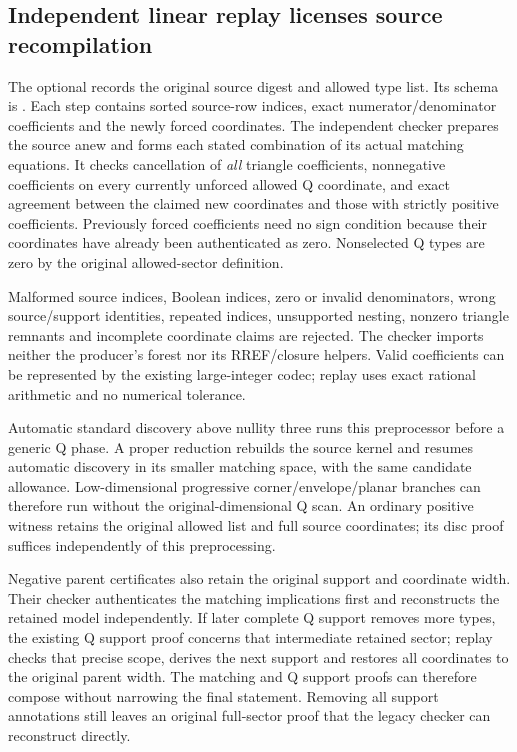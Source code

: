 \subsection{Independent linear replay licenses source recompilation}

The optional  records the original
source digest and allowed type list. Its schema is
. Each step contains sorted source-row indices, exact
numerator/denominator coefficients and the newly forced coordinates.
The independent checker prepares the source anew and forms each stated
combination of its actual matching equations. It checks cancellation of
\emph{all} triangle coefficients, nonnegative coefficients on every
currently unforced allowed Q coordinate, and exact agreement between the
claimed new coordinates and those with strictly positive coefficients.
Previously forced coefficients need no sign condition because their
coordinates have already been authenticated as zero. Nonselected Q types
are zero by the original allowed-sector definition.

Malformed source indices, Boolean indices, zero or invalid denominators,
wrong source/support identities, repeated indices, unsupported nesting,
nonzero triangle remnants and incomplete coordinate claims are rejected.
The checker imports neither the producer's forest nor its RREF/closure
helpers. Valid coefficients can be represented by the existing large-integer
codec; replay uses exact rational arithmetic and no numerical tolerance.

Automatic standard discovery above nullity three runs this preprocessor
before a generic Q phase. A proper reduction rebuilds the source kernel and
resumes automatic discovery in its smaller matching space, with the same
candidate allowance. Low-dimensional progressive corner/envelope/planar
branches can therefore run without the original-dimensional Q scan. An
ordinary positive witness retains the original allowed list and full source
coordinates; its disc proof suffices independently of this preprocessing.

Negative parent certificates also retain the original support and coordinate
width. Their checker authenticates the matching implications first and
reconstructs the retained model independently. If later complete Q support
removes more types, the existing Q support proof concerns that intermediate
retained sector; replay checks that precise scope, derives the next support
and restores all coordinates to the original parent width. The matching
and Q support proofs can therefore compose without narrowing the final
statement. Removing all support annotations still leaves an original full-sector
proof that the legacy checker can reconstruct directly.

